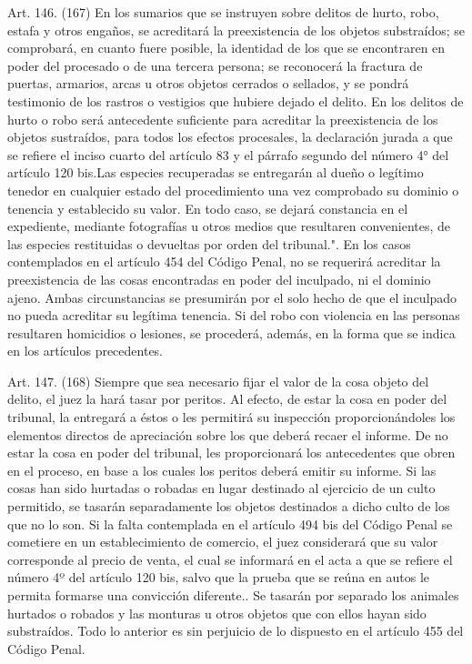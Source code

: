     Art. 146. (167) En los sumarios que se instruyen sobre delitos de hurto, robo, estafa y otros engaños, se acreditará la preexistencia de los objetos substraídos; se comprobará, en cuanto fuere posible, la identidad de los que se encontraren en poder del procesado o de una tercera persona; se reconocerá la fractura de puertas, armarios, arcas u otros objetos cerrados o sellados, y se pondrá testimonio de los rastros o vestigios que hubiere dejado el delito.
    En los delitos de hurto o robo será antecedente suficiente para acreditar la preexistencia de los objetos sustraídos, para todos los efectos procesales, la declaración jurada a que se refiere el inciso cuarto del artículo 83 y el párrafo segundo del número 4° del artículo 120 bis.Las especies recuperadas se entregarán al dueño o legítimo tenedor en cualquier estado del procedimiento una vez comprobado su dominio o tenencia y establecido su valor. En todo caso, se dejará constancia en el expediente, mediante fotografías u otros medios que resultaren convenientes, de las especies restituidas o devueltas por orden del tribunal.".
    En los casos contemplados en el artículo 454 del Código Penal, no se requerirá acreditar la preexistencia de las cosas encontradas en poder del inculpado, ni el dominio ajeno. Ambas circunstancias se presumirán por el solo hecho de que el inculpado no pueda acreditar su legítima tenencia.
    Si del robo con violencia en las personas resultaren homicidios o lesiones, se procederá, además, en la forma que se indica en los artículos precedentes.




    Art. 147. (168) Siempre que sea necesario fijar el valor de la cosa objeto del delito, el juez la hará tasar por peritos. Al efecto, de estar la cosa en poder del tribunal, la entregará a éstos o les permitirá su inspección proporcionándoles los elementos directos de apreciación sobre los que deberá recaer el informe. De no estar la cosa en poder del tribunal, les proporcionará los antecedentes que obren en el proceso, en base a los cuales los peritos deberá emitir su informe.
    Si las cosas han sido hurtadas o robadas en lugar destinado al ejercicio de un culto permitido, se tasarán separadamente los objetos destinados a dicho culto de los que no lo son.
    Si la falta contemplada en el artículo 494 bis del Código Penal se cometiere en un establecimiento de comercio, el juez considerará que su valor corresponde al precio de venta, el cual se informará en el acta a que se refiere el número 4º del artículo 120 bis, salvo que la prueba que se reúna en autos le permita formarse una convicción diferente..
    Se tasarán por separado los animales hurtados o robados y las monturas u otros objetos que con ellos hayan sido substraídos.
    Todo lo anterior es sin perjuicio de lo dispuesto en el artículo 455 del Código Penal.


